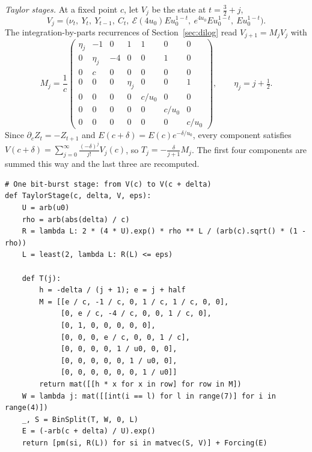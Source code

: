 \documentclass[11pt,reqno]{amsart}
\theoremstyle{definition}
\theoremstyle{remark}
\newcommand{\Eip}{\mathcal{E}}
\begin{document}
\emph{Taylor stages.} At a fixed point $c$, let $V_j$ be the state at $t = \frac32 + j$,
\[
  V_j = \bigl(\nu_t,\ Y_t,\ Y_{t-1},\ C_t,\ \Eip(4u_0)Eu_0^{1-t},\ e^{4u_0}Eu_0^{1-t},\ Eu_0^{1-t}\bigr).
\]
The integration-by-parts recurrences of Section~\ref{sec:dilog} read $V_{j+1} = M_jV_j$ with
\[
  M_j = \frac1c\begin{pmatrix}
  \eta_j & -1 & 0 & 1 & 1 & 0 & 0 \\
  0 & \eta_j & -4 & 0 & 0 & 1 & 0 \\
  0 & c & 0 & 0 & 0 & 0 & 0 \\
  0 & 0 & 0 & \eta_j & 0 & 0 & 1 \\
  0 & 0 & 0 & 0 & c/u_0 & 0 & 0 \\
  0 & 0 & 0 & 0 & 0 & c/u_0 & 0 \\
  0 & 0 & 0 & 0 & 0 & 0 & c/u_0
  \end{pmatrix}, \qquad \eta_j = j + \tfrac12.
\]
Since $\partial_cZ_t = -Z_{t+1}$ and $E(c+\delta) = E(c)e^{-\delta/u_0}$, every component satisfies
$V(c+\delta) = \sum_{j=0}^{\infty}\frac{(-\delta)^j}{j!}V_j(c)$, so $T_j = -\frac{\delta}{j+1}M_j$. The first four
components are summed this way and the last three are recomputed.
\begin{lstlisting}[style=ref, firstnumber=122]
# One bit-burst stage: from V(c) to V(c + delta)
def TaylorStage(c, delta, V, eps):
    U = arb(u0)
    rho = arb(abs(delta) / c)
    R = lambda L: 2 * (4 * U).exp() * rho ** L / (arb(c).sqrt() * (1 - rho))
    L = least(2, lambda L: R(L) <= eps)

    def T(j):
        h = -delta / (j + 1); e = j + half
        M = [[e / c, -1 / c, 0, 1 / c, 1 / c, 0, 0],
             [0, e / c, -4 / c, 0, 0, 1 / c, 0],
             [0, 1, 0, 0, 0, 0, 0],
             [0, 0, 0, e / c, 0, 0, 1 / c],
             [0, 0, 0, 0, 1 / u0, 0, 0],
             [0, 0, 0, 0, 0, 1 / u0, 0],
             [0, 0, 0, 0, 0, 0, 1 / u0]]
        return mat([[h * x for x in row] for row in M])
    W = lambda j: mat([[int(i == l) for l in range(7)] for i in range(4)])
    _, S = BinSplit(T, W, 0, L)
    E = (-arb(c + delta) / U).exp()
    return [pm(si, R(L)) for si in matvec(S, V)] + Forcing(E)
\end{lstlisting}
\end{document}
